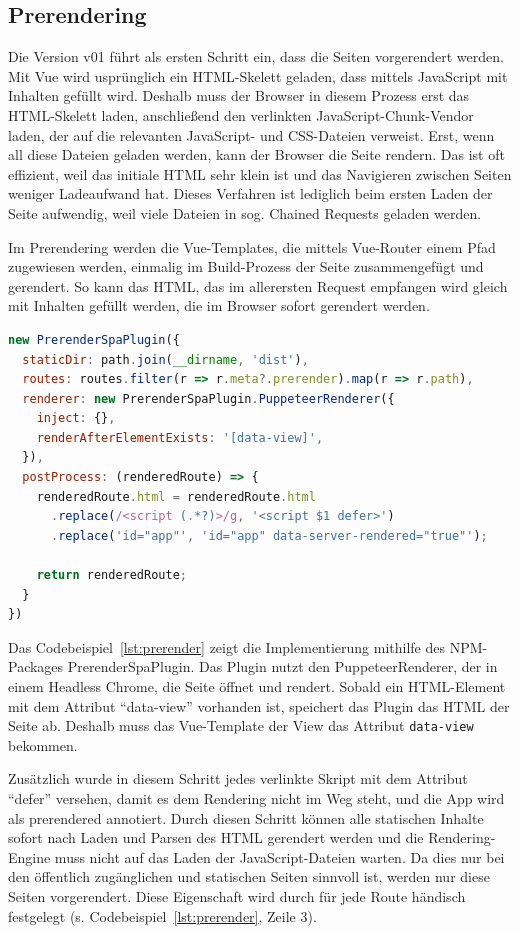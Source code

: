 \documentclass[11pt,a4paper]{article}
\begin{document}
\subsection{Prerendering}
Die Version v01 führt als ersten Schritt ein, dass die Seiten vorgerendert werden.
Mit Vue wird usprünglich ein HTML-Skelett geladen, dass mittels JavaScript mit Inhalten gefüllt wird.
Deshalb muss der Browser in diesem Prozess erst das HTML-Skelett laden, anschließend den verlinkten JavaScript-Chunk-Vendor laden, der auf die relevanten JavaScript- und CSS-Dateien verweist.
Erst, wenn all diese Dateien geladen werden, kann der Browser die Seite rendern.
Das ist oft effizient, weil das initiale HTML sehr klein ist und das Navigieren zwischen Seiten weniger Ladeaufwand hat.
Dieses Verfahren ist lediglich beim ersten Laden der Seite aufwendig, weil viele Dateien in sog. Chained Requests geladen werden.

Im Prerendering werden die Vue-Templates, die mittels Vue-Router einem Pfad zugewiesen werden, einmalig im Build-Prozess der Seite zusammengefügt und gerendert.
So kann das HTML, das im allerersten Request empfangen wird gleich mit Inhalten gefüllt werden, die im Browser sofort gerendert werden.

\begin{lstlisting}[language=JavaScript, caption={Implementierung des Single Page Prerenderings}, label={lst:prerender}]
new PrerenderSpaPlugin({
  staticDir: path.join(__dirname, 'dist'),
  routes: routes.filter(r => r.meta?.prerender).map(r => r.path),
  renderer: new PrerenderSpaPlugin.PuppeteerRenderer({
    inject: {},
    renderAfterElementExists: '[data-view]',
  }),
  postProcess: (renderedRoute) => {
    renderedRoute.html = renderedRoute.html
      .replace(/<script (.*?)>/g, '<script $1 defer>')
      .replace('id="app"', 'id="app" data-server-rendered="true"');

    return renderedRoute;
  }
})
\end{lstlisting}

Das Codebeispiel~\ref{lst:prerender} zeigt die Implementierung mithilfe des NPM-Packages PrerenderSpaPlugin.
Das Plugin nutzt den PuppeteerRenderer, der in einem Headless Chrome, die Seite öffnet und rendert.
Sobald ein HTML-Element mit dem Attribut \enquote{data-view} vorhanden ist, speichert das Plugin das HTML der Seite ab.
Deshalb muss das Vue-Template der View das Attribut \verb|data-view| bekommen.

Zusätzlich wurde in diesem Schritt jedes verlinkte Skript mit dem Attribut \enquote{defer} versehen, damit es dem Rendering nicht im Weg steht, und die App wird als prerendered annotiert. 
Durch diesen Schritt können alle statischen Inhalte sofort nach Laden und Parsen des HTML gerendert werden und die Rendering-Engine muss nicht auf das Laden der JavaScript-Dateien warten.
Da dies nur bei den öffentlich zugänglichen und statischen Seiten sinnvoll ist, werden nur diese Seiten vorgerendert.
Diese Eigenschaft wird durch für jede Route händisch festgelegt (s. Codebeispiel~\ref{lst:prerender}, Zeile 3).
\end{document}
